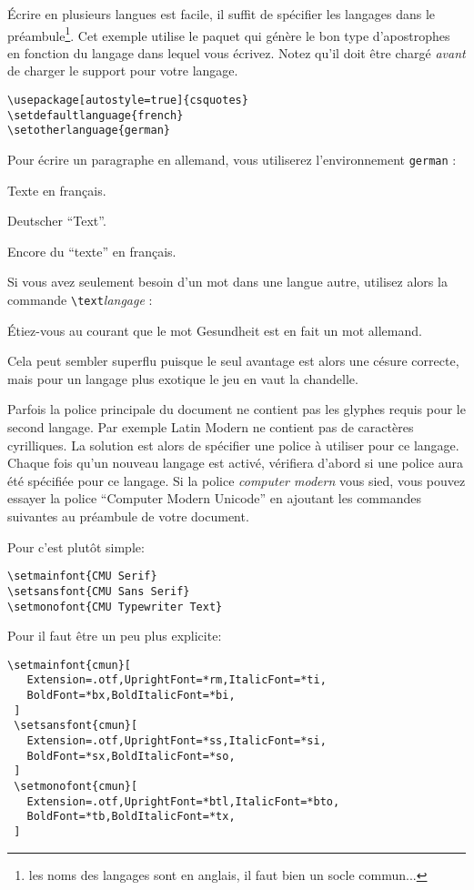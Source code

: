 Écrire en plusieurs langues est facile, il suffit de spécifier les
langages dans le préambule\footnote{les noms des langages sont en
  anglais, il faut bien un socle commun... \NdT}. Cet exemple utilise
le paquet  qui génère le bon type d'apostrophes en
fonction du langage dans lequel vous écrivez. Notez qu'il doit être
chargé \emph{avant} de charger le support pour votre langage.

\begin{lscommand}
\verb|\usepackage[autostyle=true]{csquotes}|\\
\verb|\setdefaultlanguage{french}|\\
\verb|\setotherlanguage{german}|
\end{lscommand}
%
Pour écrire un paragraphe en allemand, vous utiliserez l'environnement
\texttt{german} :

\begin{example}
Texte en français.
\begin{german}
Deutscher \enquote{Text}.
\end{german}
Encore du \enquote{texte} en français.
\end{example}

Si vous avez seulement besoin d'un mot dans une langue autre, utilisez
alors la commande \verb|\text|\emph{langage} :

\begin{example}
Étiez-vous au courant que le mot
\textgerman{Gesundheit}
est en fait un mot allemand.
\end{example}

Cela peut sembler superflu puisque le seul avantage est alors une
césure correcte, mais pour un langage plus exotique le jeu en vaut la
chandelle.

Parfois la police principale du document ne contient pas les glyphes
requis pour le second langage. Par exemple Latin Modern ne contient pas de
caractères cyrilliques. La solution est alors de spécifier une
police à utiliser pour ce langage. Chaque fois qu'un nouveau langage
est activé,  vérifiera d'abord si une police aura été
spécifiée pour ce langage.
Si la police \emph{computer modern} vous sied, vous pouvez essayer la
police \enquote{Computer Modern Unicode} en ajoutant les commandes
suivantes au préambule de votre document.

\medskip\noindent Pour  c'est plutôt simple:
\begin{verbatim}
\setmainfont{CMU Serif}
\setsansfont{CMU Sans Serif}
\setmonofont{CMU Typewriter Text}
\end{verbatim}
\noindent Pour  il faut être un peu plus explicite:
\begin{verbatim}
\setmainfont{cmun}[
   Extension=.otf,UprightFont=*rm,ItalicFont=*ti,
   BoldFont=*bx,BoldItalicFont=*bi,
 ]
 \setsansfont{cmun}[
   Extension=.otf,UprightFont=*ss,ItalicFont=*si,
   BoldFont=*sx,BoldItalicFont=*so,
 ]
 \setmonofont{cmun}[
   Extension=.otf,UprightFont=*btl,ItalicFont=*bto,
   BoldFont=*tb,BoldItalicFont=*tx,
 ]
\end{verbatim}


